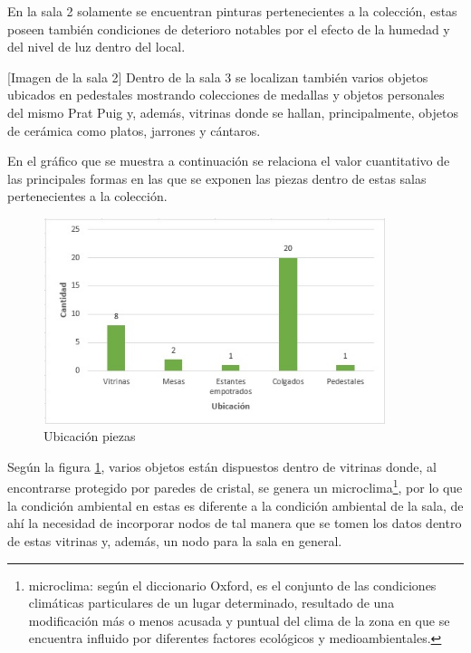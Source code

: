     En la sala 2 solamente se encuentran pinturas pertenecientes a la colección, estas poseen también condiciones de deterioro notables por el efecto de la humedad y del nivel de luz dentro del local.

    [Imagen de la sala 2]\newline
    Dentro de la sala 3 se localizan también varios objetos ubicados en pedestales mostrando colecciones de medallas y objetos personales del mismo Prat Puig y, además, vitrinas donde se hallan, principalmente, objetos de cerámica como platos, jarrones y cántaros.\newline

    En el gráfico que se muestra a continuación se relaciona el valor cuantitativo de las principales formas en las que se exponen las piezas dentro de estas salas pertenecientes a la colección.

    \begin{figure}[H]
        \centering
        \includegraphics[width=10cm, height=6cm]{imagenes/formas expositivas.jpg}
        \caption{Ubicación piezas}
        \label{imag:ubicacion_piezas}
    \end{figure}

    Según la figura \ref{imag:ubicacion_piezas}, varios objetos están dispuestos dentro de vitrinas donde, al encontrarse protegido por paredes de cristal, se genera un microclima\footnote{microclima: según el diccionario Oxford, es el conjunto de las condiciones climáticas particulares de un lugar determinado, resultado de una modificación más o menos acusada y puntual del clima de la zona en que se encuentra influido por diferentes factores ecológicos y medioambientales.}, por lo que la condición ambiental en estas es diferente a la condición ambiental de la sala, de ahí la necesidad de incorporar nodos de tal manera que se tomen los datos dentro de estas vitrinas y, además, un nodo para la sala en general.

